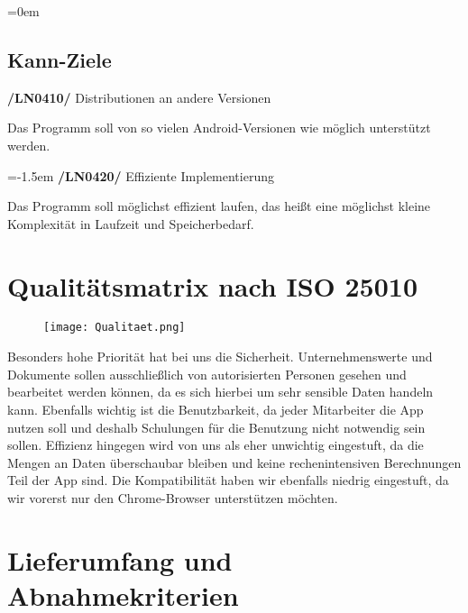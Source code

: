 \documentclass[11pt,a4paper]{report}
\begin{document}
\leftskip=0em
\subsection{Kann-Ziele}
\textbf{/LN0410/} Distributionen an andere Versionen
\par
\begingroup
\leftskip=1cm
\noindent Das Programm soll von so vielen Android-Versionen wie möglich unterstützt werden.\\
\par
\endgroup

\leftskip=-1.5em
\textbf{/LN0420/} Effiziente Implementierung
\par
\begingroup
\leftskip=1cm
\noindent Das Programm soll möglichst effizient laufen, das heißt eine möglichst kleine Komplexität in Laufzeit und Speicherbedarf.\\
\par
\endgroup

\section{Qualitätsmatrix nach ISO 25010}
\begin{figure}[h]
\begin{center}
\texttt{[image: Qualitaet.png]}
\end{center}
\end{figure}
Besonders hohe Priorität hat bei uns die Sicherheit. Unternehmenswerte und Dokumente sollen ausschließlich von autorisierten Personen gesehen und bearbeitet werden können, da es sich hierbei um sehr sensible Daten handeln kann.
Ebenfalls wichtig ist die Benutzbarkeit, da jeder Mitarbeiter die App nutzen soll und deshalb Schulungen für die Benutzung nicht notwendig sein sollen.
Effizienz hingegen wird von uns als eher unwichtig eingestuft, da die Mengen an Daten überschaubar bleiben und keine rechenintensiven Berechnungen Teil der App sind.
Die Kompatibilität haben wir ebenfalls niedrig eingestuft, da wir vorerst nur den Chrome-Browser unterstützen möchten.
\newpage

\section{Lieferumfang und Abnahmekriterien}
\newpage
\end{document}

